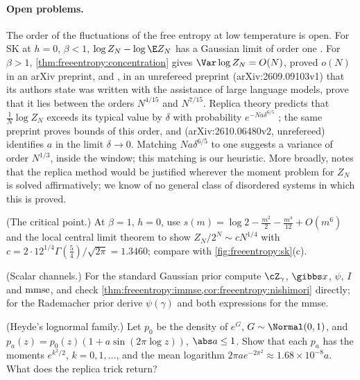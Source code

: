 \begin{refsection}
\paragraph{Open problems.} The order of the fluctuations of the free entropy at low temperature is open. For SK at $h=0$, $\beta<1$, $\log Z_N-\log\E Z_N$ has a Gaussian limit of order one \parencite{AizenmanLebowitzRuelle1987}. For $\beta>1$, \cref{thm:freeentropy:concentration} gives $\Var\log Z_N=O(N)$, \textcite{Chatterjee2009} proved $o(N)$ in an arXiv preprint, and \textcite{AronowLopatto2026a}, in an unrefereed preprint (arXiv:2609.09103v1) that its authors state was written with the assistance of large language models, prove that it lies between the orders $N^{4/15}$ and $N^{7/15}$. Replica theory predicts that $\frac1N\log Z_N$ exceeds its typical value by $\delta$ with probability $e^{-Na\delta^{6/5}}$ \parencite{ParisiRizzo2009}; the same preprint proves bounds of this order, and \textcite{Pei2026} (arXiv:2610.06480v2, unrefereed) identifies $a$ in the limit $\delta\to0$. Matching $Na\delta^{6/5}$ to one suggests a variance of order $N^{1/3}$, inside the window; this matching is our heuristic. More broadly, \textcite{Tanaka2007} notes that the replica method would be justified wherever the moment problem for $Z_N$ is solved affirmatively; we know of no general class of disordered systems in which this is proved.

\begin{exercises}
\item \consolidation (The critical point.) At $\beta=1$, $h=0$, use $s(m)=\log2-\frac{m^2}2-\frac{m^4}{12}+O(m^6)$ and the local central limit theorem to show $Z_N/2^N\sim cN^{1/4}$ with $c=2\cdot12^{1/4}\Gamma(\frac54)/\sqrt{2\pi}=1.3460$; compare with \cref{fig:freeentropy:sk}(c).\label{ex:freeentropy:critical}

\item \consolidation (Scalar channels.) For the standard Gaussian prior compute $\cZ_\gamma$, $\gibbs x$, $\psi$, $I$ and $\mathrm{mmse}$, and check \cref{thm:freeentropy:immse,cor:freeentropy:nishimori} directly; for the Rademacher prior derive $\psi(\gamma)$ and both expressions for the mmse.\label{ex:freeentropy:scalar}

\item \consolidation (Heyde's lognormal family.) Let $p_0$ be the density of $e^G$, $G\sim\Normal(0,1)$, and $p_a(z)=p_0(z)(1+a\sin(2\pi\log z))$, $\abs a\le1$. Show that each $p_a$ has the moments $e^{k^2/2}$, $k=0,1,\dots$, and the mean logarithm $2\pi ae^{-2\pi^2}\approx1.68\times10^{-8}a$. What does the replica trick return? \label{ex:freeentropy:heyde}


\end{exercises}
\end{refsection}
